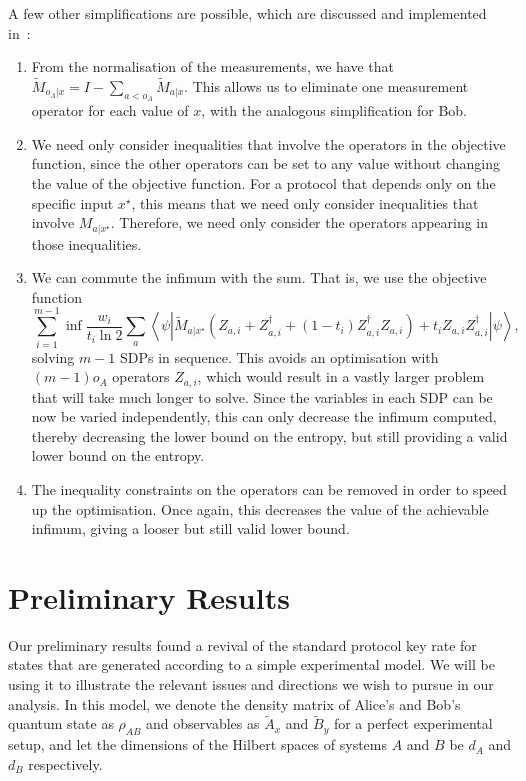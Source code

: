 \documentclass[10pt, a4paper]{article}
\numberwithin{equation}{section} %
\theoremstyle{definition}
\theoremstyle{plain}
\newcommand{\?}{\mathrel{?}} %
\newcommand{\angleb}[1]{\left\langle #1 \right\rangle} %
\begin{document}
      A few other simplifications are possible, which are discussed and implemented in~\cite{BFF_QRE}:
      \begin{enumerate}
        \item From the normalisation of the measurements, we have that \(\tilde{M}_{o_A|x} = I - \sum_{a < o_A} \tilde{M}_{a|x}\). This allows us to eliminate one measurement operator for each value of \(x\), with the analogous simplification for Bob.
        \item We need only consider inequalities that involve the operators in the objective function, since the other operators can be set to any value without changing the value of the objective function. For a protocol that depends only on the specific input \(x^{\star}\), this means that we need only consider inequalities that involve \(M_{a|x^{\star}}\). Therefore, we need only consider the operators appearing in those inequalities.
        \item We can commute the infimum with the sum. That is, we use the objective function
          \begin{equation} 
            \sum_{i=1}^{m-1} \inf \frac{w_i}{t_i \ln 2} \sum_a \angleb{\psi\left|
          \tilde{M}_{a|x^{\star}} \left( Z_{a,i} + Z_{a,i}^{\dagger} + (1-t_i)  Z_{a,i}^{\dagger}Z_{a,i}\right) + t_i Z_{a,i}Z_{a,i}^{\dagger} \right|\psi},
          \end{equation}
          solving \(m-1\) SDPs in sequence. This avoids an optimisation with \((m-1)o_A\) operators \(Z_{a,i}\), which would result in a vastly larger problem that will take much longer to solve. Since the variables in each SDP can be now be varied independently, this can only decrease the infimum computed, thereby decreasing the lower bound on the entropy, but still providing a valid lower bound on the entropy.
        \item The inequality constraints on the operators can be removed in order to speed up the optimisation. Once again, this decreases the value of the achievable infimum, giving a looser but still valid lower bound.
      \end{enumerate}

    \section{Preliminary Results}\label{sec:preres}

    Our preliminary results found a revival of the standard protocol key rate for states that are generated according to a simple experimental model. We will be using it to illustrate the relevant issues and directions we wish to pursue in our analysis. In this model, we denote the density matrix of Alice's and Bob's quantum state as \(\rho_{AB}\) and observables as \(\tilde{A}_x\) and \(\tilde{B}_y\) for a perfect experimental setup, and let the dimensions of the Hilbert spaces of systems \(A\) and \(B\) be \(d_A\) and \(d_B\) respectively.
\end{document}
